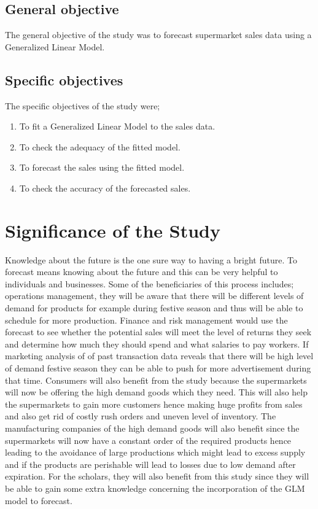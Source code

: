 \subsection{General objective}
The general objective of the study was to forecast supermarket sales data using a Generalized Linear  Model. 

\subsection{Specific objectives}
The specific objectives of the study were;
\begin{enumerate}[label=\roman*.]
	\item To fit a Generalized Linear Model to the sales data.
	
	\item To check the adequacy of the fitted model.	
	
	\item To forecast the sales using the fitted model.
	
	\item To check the accuracy of the forecasted sales. 
\end{enumerate}

\section{Significance of the Study}
Knowledge about the future is the one sure way to having a bright future. To forecast means knowing about the future and this can be very helpful to individuals and businesses. Some of the beneficiaries of this process includes; operations management, they will be aware that there will be different levels of demand for products for example during festive season and thus will be able to schedule for more production. Finance and risk management would use the forecast to see whether the potential sales will meet the level of returns they seek and determine how much they should spend and what salaries to pay workers. If marketing analysis of of past transaction data reveals that there will be high level of demand festive season they can be able to push for more advertisement during that time. Consumers will also benefit from the study because the supermarkets will now be offering the high demand goods which they need. This will also help the supermarkets to gain more customers hence making huge profits from sales and also get rid of costly rush orders and uneven level of inventory. The manufacturing companies of the high demand goods will also benefit since the supermarkets will now have a constant order of the required products hence leading to the avoidance of large productions which might lead to excess supply and if the products are perishable will lead to losses due to low demand after expiration. For the scholars, they will also benefit from this study since they will be able to gain some extra knowledge concerning the incorporation of the GLM model to forecast.